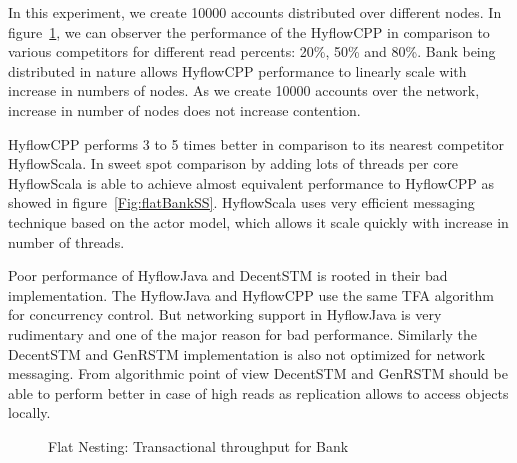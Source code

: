 \documentclass[12pt,english]{report}
\begin{document}
In this experiment, we create 10000 accounts distributed over different nodes. In figure~\ref{Fig:flatBank}, we can observer the performance of the HyflowCPP in comparison to various competitors for different read percents: 20\%, 50\% and 80\%. Bank being distributed in nature allows HyflowCPP performance to linearly scale with increase in numbers of nodes. As we create 10000 accounts over the network, increase in number of nodes does not increase contention.

HyflowCPP performs 3 to 5 times better in comparison to its nearest competitor HyflowScala. In sweet spot comparison by adding lots of threads per core HyflowScala is able to achieve almost equivalent performance to HyflowCPP as showed in figure~\ref{Fig:flatBankSS}. HyflowScala uses very efficient messaging technique based on the actor model, which allows it scale quickly with increase in number of threads.

Poor performance of HyflowJava and  DecentSTM is rooted in their bad implementation. The HyflowJava and HyflowCPP use the same TFA algorithm for concurrency control. But networking support in HyflowJava is very rudimentary and one of the major reason for bad performance. Similarly the DecentSTM and GenRSTM implementation is also not optimized for network messaging. From algorithmic point of view DecentSTM and GenRSTM should be able to perform better in case of high reads as replication allows to access objects locally.

\begin{figure}
\centering
{}
\end{figure}
\begin{figure}[H]
\centering
{}
\end{figure}
\begin{figure}[H]
\centering
{}
\end{figure}
\begin{figure}[H]
\centering
{}
\caption{Flat Nesting: Transactional throughput for Bank}
\label{Fig:flatBank}
\end{figure}
\end{document}
